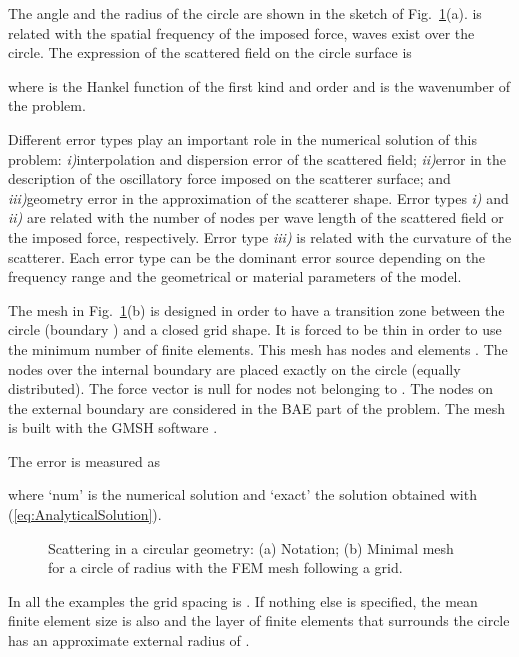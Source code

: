 \documentclass[12pt]{article}
\newcommand{\fref}[1]{Fig.~\ref{#1}}
\begin{document}
The angle  and the radius  of the circle are shown in the sketch of \fref{fig:TheMesh}(a).  is related with the spatial frequency of the imposed force,   waves exist over the circle. The expression of the scattered field on the circle surface is

where  is the Hankel function of the first kind and order  and  is the wavenumber of the problem.

Different error types play an important role in the numerical solution of this problem: \textit{i)}interpolation and dispersion error of the scattered field; \textit{ii)}error in the description of the oscillatory force imposed on the scatterer surface; and \textit{iii)}geometry error in the approximation of the scatterer shape. Error types \textit{i)} and \textit{ii)} are related with the number of nodes per wave length of the scattered field or the imposed force, respectively. Error type \textit{iii)} is related with the curvature of the scatterer. Each error type can be the dominant error source depending on the frequency range and the geometrical or material parameters of the model.

The mesh in \fref{fig:TheMesh}(b) is designed in order to have a transition zone between the circle (boundary ) and a closed grid shape. It is forced to be thin in order to use the minimum number of finite elements. This mesh has nodes  and elements . The nodes over the internal boundary  are placed exactly on the circle (equally distributed). The force vector is null for nodes not belonging to . The nodes on the external boundary  are considered in the BAE part of the problem. The mesh is built with the GMSH software \cite{Geuzaine-Remacle:2009}.

The error is measured as

where `num' is the numerical solution and `exact' the solution obtained with (\ref{eq:AnalyticalSolution}).

\begin{figure}[ht]
 
\caption{Scattering in a circular geometry: (a) Notation; (b) Minimal mesh for a circle of radius  with the FEM mesh following a grid.}
\label{fig:TheMesh}
\end{figure}

In all the examples the grid spacing is . If nothing else is specified, the mean finite element size is also  and the layer of finite elements that surrounds the circle has an approximate external radius of .
\end{document}
